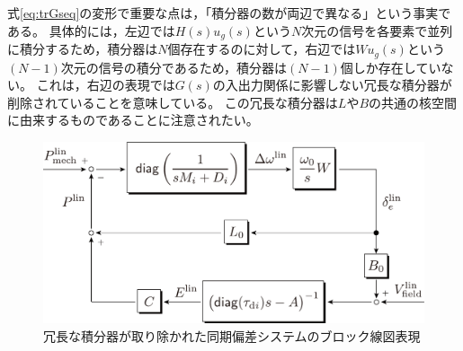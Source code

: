 \documentclass[tombow,dvipdfmx]{corona-a5}
\begin{document}
式\ref{eq:trGseq}の変形で重要な点は，「積分器の数が両辺で異なる」という事実である。
具体的には，左辺では$H(s) u_g(s)$という$N$次元の信号を各要素で並列に積分するため，積分器は$N$個存在するのに対して，右辺では$W u_g(s)$という$(N-1)$次元の信号の積分であるため，積分器は$(N-1)$個しか存在していない。
これは，右辺の表現では$G(s)$の入出力関係に影響しない冗長な積分器が削除されていることを意味している。
この冗長な積分器は$L$や$B$の共通の核空間に由来するものであることに注意されたい。


\begin{figure}[t]
\centering
\includegraphics[width = .75\linewidth]{figs/blocklinsysnew}
\caption{冗長な積分器が取り除かれた同期偏差システムのブロック線図表現}
\label{fig:blocklinnew}
\end{figure}
\end{document}
